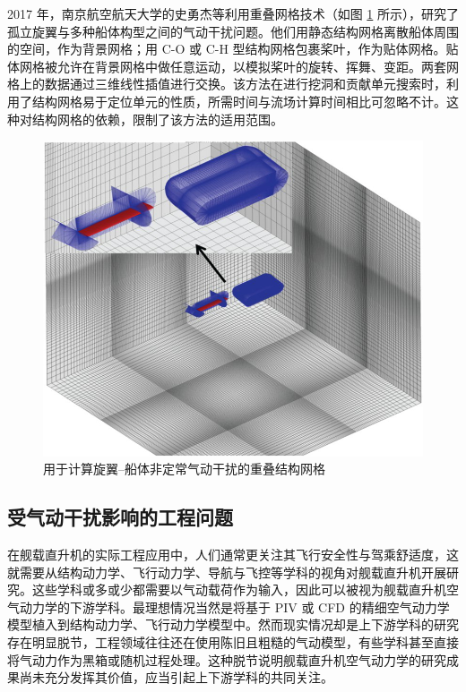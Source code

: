 2017 年，南京航空航天大学的史勇杰等利用重叠网格技术（如图 \ref{fig:overset-mesh}
所示），研究了孤立旋翼与多种船体构型之间的气动干扰问题。他们用静态结构网格离散船体周围的空间，作为背景网格；用 C-O 或 C-H
型结构网格包裹桨叶，作为贴体网格。贴体网格被允许在背景网格中做任意运动，以模拟桨叶的旋转、挥舞、变距。两套网格上的数据通过三维线性插值进行交换。该方法在进行挖洞和贡献单元搜索时，利用了结构网格易于定位单元的性质，所需时间与流场计算时间相比可忽略不计。这种对结构网格的依赖，限制了该方法的适用范围。
\begin{figure}[h!]
\begin{centering}
\includegraphics[width=1\textwidth,height=0.32\textheight,keepaspectratio]{figures/overset_mesh.jpeg}
\par\end{centering}
\caption{\label{fig:overset-mesh}用于计算旋翼–船体非定常气动干扰的重叠结构网格}
\end{figure}


\subsection{受气动干扰影响的工程问题}

在舰载直升机的实际工程应用中，人们通常更关注其飞行安全性与驾乘舒适度，这就需要从结构动力学、飞行动力学、导航与飞控等学科的视角对舰载直升机开展研究。这些学科或多或少都需要以气动载荷作为输入，因此可以被视为舰载直升机空气动力学的下游学科。最理想情况当然是将基于
PIV 或 CFD 的精细空气动力学模型植入到结构动力学、飞行动力学模型中。然而现实情况却是上下游学科的研究存在明显脱节，工程领域往往还在使用陈旧且粗糙的气动模型，有些学科甚至直接将气动力作为黑箱或随机过程处理。这种脱节说明舰载直升机空气动力学的研究成果尚未充分发挥其价值，应当引起上下游学科的共同关注。

